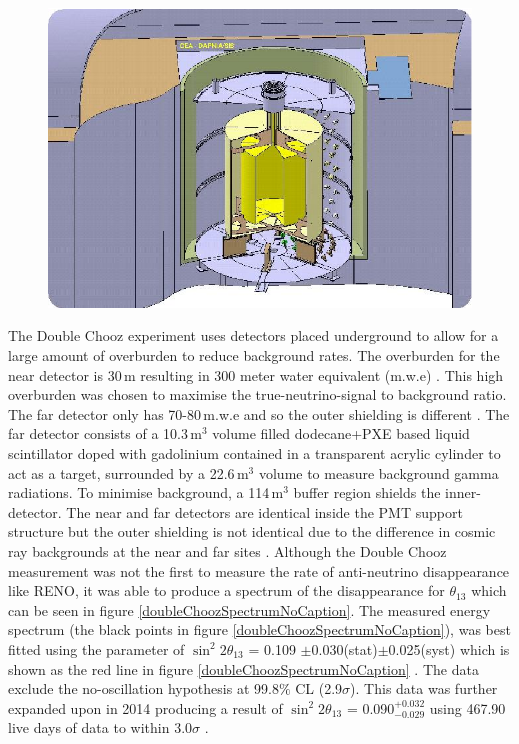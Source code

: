 \begin{figure}[!h]
 \centering
 \includegraphics[width=0.5\linewidth]{Chapter1/Figs/Raster/doublChoozDetectorDiagram.png} %
 \label{fig:DoubleChoozFarDetector}
\end{figure}
The Double Chooz experiment uses detectors placed underground to allow for a large amount of overburden to reduce background rates. The overburden for the near detector is 30\,m resulting in 300 meter water equivalent (m.w.e) \cite{lasserre2006}. This high overburden was chosen to maximise the true-neutrino-signal to background ratio. The far detector only has 70-80\,m.w.e and so the outer shielding is different \cite{lasserre2006}. The far detector consists of a 10.3\,m$^3$ volume filled dodecane+PXE based liquid scintillator doped with gadolinium contained in a transparent acrylic cylinder to act as a target, surrounded by a 22.6\,m$^3$ volume to measure background gamma radiations. To minimise background, a 114\,m$^3$ buffer region shields the inner-detector. The near and far detectors are identical inside the PMT support structure but the outer shielding is not identical due to the difference in cosmic ray backgrounds at the near and far sites \cite{lasserre2006}. Although the Double Chooz measurement  was not the first to measure the rate of anti-neutrino disappearance \cite{reno_may_2012} like RENO, it was able to produce a spectrum of the disappearance for $\theta_{13}$ which can be seen in figure \ref{doubleChoozSpectrumNoCaption}. The measured energy spectrum (the black points in figure \ref{doubleChoozSpectrumNoCaption}), was best fitted using the parameter of $\sin^2{2\theta_{13}}$ = 0.109 $\pm$0.030(stat)$\pm$0.025(syst) which is shown as the red line in figure \ref{doubleChoozSpectrumNoCaption} \cite{Abe_2012}. The data exclude the no-oscillation hypothesis at 99.8$\%$ CL (2.9$\sigma$)\cite{Abe_2012}. This data was further expanded upon in 2014 producing a result of $\sin^2{2\theta_{13}}$ = 0.090$^{+0.032}_{-0.029}$ using 467.90 live days of data to within $3.0\sigma$ \cite{abe2014improved}.
